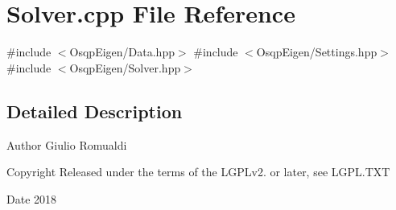\section{Solver.\+cpp File Reference}
\label{Solver_8cpp}
{\ttfamily \#include $<$Osqp\+Eigen/\+Data.\+hpp$>$}\newline
{\ttfamily \#include $<$Osqp\+Eigen/\+Settings.\+hpp$>$}\newline
{\ttfamily \#include $<$Osqp\+Eigen/\+Solver.\+hpp$>$}\newline


\subsection{Detailed Description}
\begin{DoxyAuthor}{Author}
Giulio Romualdi 
\end{DoxyAuthor}
\begin{DoxyCopyright}{Copyright}
Released under the terms of the L\+G\+P\+Lv2. or later, see L\+G\+P\+L.\+T\+XT 
\end{DoxyCopyright}
\begin{DoxyDate}{Date}
2018 
\end{DoxyDate}
